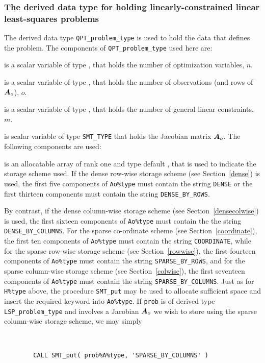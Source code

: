 \documentclass{galahad}
\newcommand{\packagename}{LSP}
\begin{document}

\subsubsection{The derived data type for holding linearly-constrained linear least-squares problems}
\label{typeqp}

The derived data type 
{\tt QPT\_problem\_type}
is used to hold the data that defines the problem.
The components of 
{\tt QPT\_problem\_type} used here are:

\begin{description}

 is a scalar variable of type \integer, 
 that holds the number of optimization variables, $n$.  
              
 is a scalar variable of type \integer, 
 that holds the number of observations (and rows of ${\bm{A}}_o$), $o$.
              
 is a scalar variable of type \integer, 
 that holds the number of general linear constraints, $m$.
              
 is scalar variable of type {\tt SMT\_TYPE} 
that holds the Jacobian matrix ${\bm{A}}_o$. The following components are used:

\begin{description}

 is an allocatable array of rank one and type default \character, 
that is used to indicate the storage scheme used. If the dense row-wise 
storage scheme (see Section~\ref{dense}) is used, 
the first five components of {\tt Ao\%type} must contain the
string {\tt DENSE} or the first thirteen components must contain the
string {\tt DENSE\_BY\_ROWS}.

By contrast, if the dense column-wise storage scheme 
(see Section~\ref{densecolwise}) is used, 
the first sixteen components of {\tt Ao\%type} must contain the
the string {\tt DENSE\_BY\_COLUMNS}.
For the sparse co-ordinate scheme (see Section~\ref{coordinate}), 
the first ten components of {\tt Ao\%type} must contain the
string {\tt COORDINATE}, while 
for the sparse row-wise storage scheme (see Section~\ref{rowwise}),
the first fourteen components of {\tt Ao\%type} must contain the
string {\tt SPARSE\_BY\_ROWS},
and for the sparse column-wise storage scheme (see Section~\ref{colwise}),
the first seventeen components of {\tt Ao\%type} must contain the
string {\tt SPARSE\_BY\_COLUMNS}.
Just as for {\tt H\%type} above, the procedure {\tt SMT\_put} 
may be used to allocate sufficient space and insert the required keyword
into {\tt Ao\%type}.
If {\tt prob} is of derived type {\tt \packagename\_problem\_type}
and involves a Jacobian ${\bm{A}}_o$ we wish to store using the sparse column-wise 
storage scheme, we may simply
{\tt 
\begin{verbatim}
        CALL SMT_put( prob%A%type, 'SPARSE_BY_COLUMNS' )
\end{verbatim}
}
\noindent


\end{description}
\end{description}
\end{document}
